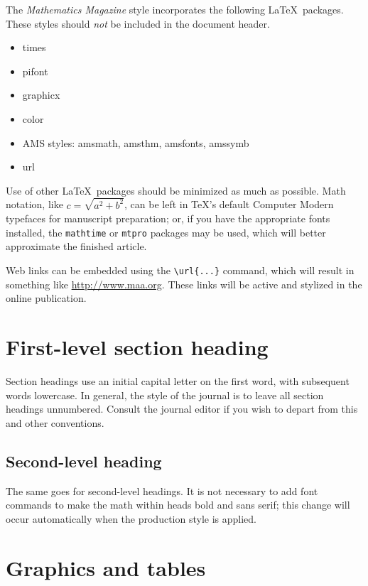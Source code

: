 \documentclass{book}
\theoremstyle{theorem}
\theoremstyle{definition}
\begin{document}
    The \textit{Mathematics Magazine} style incorporates the following \LaTeX\ packages.  These styles should \textit{not} be included in the document header.
    \begin{itemize}
        \item times
        \item pifont
        \item graphicx
        \item color
        \item AMS styles: amsmath, amsthm, amsfonts, amssymb
        \item url
    \end{itemize}
    Use of other \LaTeX\ packages should be minimized as much as possible. Math notation, like $c = \sqrt{a^2 +b^2}$, can be left in \TeX's default Computer Modern typefaces for manuscript preparation; or, if you have the appropriate fonts installed, the \texttt{mathtime} or \texttt{mtpro} packages may be used, which will better approximate the finished article.

    Web links can be embedded using the \verb~\url{...}~ command, which will result in something like \url{http://www.maa.org}.  These links will be active and stylized in the online publication.

    \section{First-level section heading}

    Section headings use an initial capital letter on the first word, with subsequent words lowercase.  In general, the style of the journal is to leave all section headings unnumbered.  Consult the journal editor if you wish to depart from this and other conventions.

    \subsection{Second-level heading}

    The same goes for second-level headings.  It is not necessary to add font commands to make the math within heads bold and sans serif; this change will occur automatically when the production style is applied.

    \section{Graphics and tables}
\end{document}
